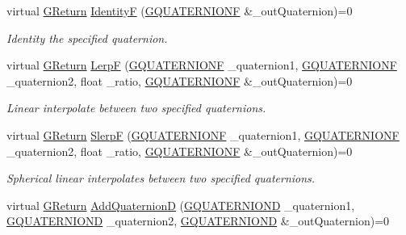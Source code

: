 \begin{DoxyCompactItemize}
virtual \mbox{\hyperlink{namespaceGW_a67a839e3df7ea8a5c5686613a7a3de21}{G\+Return}} \mbox{\hyperlink{classGW_1_1MATH_1_1GQuaternion_a4aac4b3d58d3f7ceb2c53c6651ccd15e}{IdentityF}} (\mbox{\hyperlink{structGW_1_1MATH_1_1GQUATERNIONF}{G\+Q\+U\+A\+T\+E\+R\+N\+I\+O\+NF}} \&\+\_\+out\+Quaternion)=0
\begin{DoxyCompactList}\small\item\em Identity the specified quaternion. \end{DoxyCompactList}\item 
virtual \mbox{\hyperlink{namespaceGW_a67a839e3df7ea8a5c5686613a7a3de21}{G\+Return}} \mbox{\hyperlink{classGW_1_1MATH_1_1GQuaternion_a1de2282e65771089996872bc7e90ade0}{LerpF}} (\mbox{\hyperlink{structGW_1_1MATH_1_1GQUATERNIONF}{G\+Q\+U\+A\+T\+E\+R\+N\+I\+O\+NF}} \+\_\+quaternion1, \mbox{\hyperlink{structGW_1_1MATH_1_1GQUATERNIONF}{G\+Q\+U\+A\+T\+E\+R\+N\+I\+O\+NF}} \+\_\+quaternion2, float \+\_\+ratio, \mbox{\hyperlink{structGW_1_1MATH_1_1GQUATERNIONF}{G\+Q\+U\+A\+T\+E\+R\+N\+I\+O\+NF}} \&\+\_\+out\+Quaternion)=0
\begin{DoxyCompactList}\small\item\em Linear interpolate between two specified quaternions. \end{DoxyCompactList}\item 
virtual \mbox{\hyperlink{namespaceGW_a67a839e3df7ea8a5c5686613a7a3de21}{G\+Return}} \mbox{\hyperlink{classGW_1_1MATH_1_1GQuaternion_a1dc2330222c0a78796629503847a67c7}{SlerpF}} (\mbox{\hyperlink{structGW_1_1MATH_1_1GQUATERNIONF}{G\+Q\+U\+A\+T\+E\+R\+N\+I\+O\+NF}} \+\_\+quaternion1, \mbox{\hyperlink{structGW_1_1MATH_1_1GQUATERNIONF}{G\+Q\+U\+A\+T\+E\+R\+N\+I\+O\+NF}} \+\_\+quaternion2, float \+\_\+ratio, \mbox{\hyperlink{structGW_1_1MATH_1_1GQUATERNIONF}{G\+Q\+U\+A\+T\+E\+R\+N\+I\+O\+NF}} \&\+\_\+out\+Quaternion)=0
\begin{DoxyCompactList}\small\item\em Spherical linear interpolates between two specified quaternions. \end{DoxyCompactList}\item 
virtual \mbox{\hyperlink{namespaceGW_a67a839e3df7ea8a5c5686613a7a3de21}{G\+Return}} \mbox{\hyperlink{classGW_1_1MATH_1_1GQuaternion_a7b2b661a82bd6370567ab2a31c463cea}{Add\+QuaternionD}} (\mbox{\hyperlink{structGW_1_1MATH_1_1GQUATERNIOND}{G\+Q\+U\+A\+T\+E\+R\+N\+I\+O\+ND}} \+\_\+quaternion1, \mbox{\hyperlink{structGW_1_1MATH_1_1GQUATERNIOND}{G\+Q\+U\+A\+T\+E\+R\+N\+I\+O\+ND}} \+\_\+quaternion2, \mbox{\hyperlink{structGW_1_1MATH_1_1GQUATERNIOND}{G\+Q\+U\+A\+T\+E\+R\+N\+I\+O\+ND}} \&\+\_\+out\+Quaternion)=0

\end{DoxyCompactItemize}
